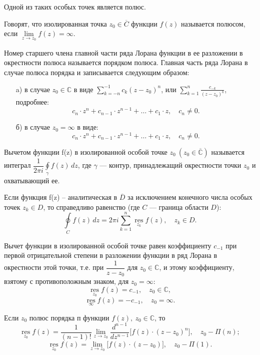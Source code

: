 Одной из таких особых точек является полюс.
\begin{definition}
Говорят, что изолированная точка $z_0\in \overline{C}$ функции $f(z)$ называется полюсом, если $\lim\limits_{z\to z_0}f(z)=\infty$.
\end{definition}
\begin{remark}
Номер старшего члена главной части ряда Лорана функции в ее разложении в окрестности полюса называется порядком полюса.
Главная часть ряда Лорана в случае полюса порядка и записывается следующим образом:
\begin{itemize}
\item[a)] в случае $z_0\in\mathbb{C}$ в виде $\sum_{k=-n}^{-1} c_k(z-z_0)^n$, или $\sum_{k=1}^{n} \frac{c_{-k}}{(z-z_0)^k}$, подробнее:
$$
c_n\cdot z^n+ c_{n-1}\cdot z^{n-1}+\ldots+c_1\cdot z,\quad c_n\ne0.
$$
\item[б)] в случае $z_0=\infty$ в виде:
$$
c_n\cdot z^n+ c_{n-1}\cdot z^{n-1}+\ldots+c_1\cdot z,\quad c_n\ne0.
$$
\end{itemize}
\end{remark}
\begin{definition}
Вычетом функции f(z) в изолированной особой точке $z_0~(z_0\in \overline{\mathbb{C}})$ называется интеграл $\dfrac{1}{2\pi i}\oint\limits_{\gamma} f(z)\,dz$, где $\gamma$ — контур, принадлежащий окрестности точки $z_0$ и охватывающий ее. 
\end{definition}
\begin{theorem}
Если функция f(z) -- аналитическая в $\overline{D}$ за исключением конечного числа особых точек $z_k\in D$, то справедливо равенство (где $C$ — граница области $D$):
\begin{equation}\label{ch1.rest}
\oint\limits_{C}f(z)\,dz= 2\pi i \sum_{k=1}^{n} \mathop{\operatorname{res}}\limits_{z_k} f(z),\quad z_k\in D.
\end{equation}
\end{theorem}
\begin{assertion}
Вычет функции в изолированной особой точке равен коэффициенту $c_{-1}$ при первой отрицательной степени в разложении функции в ряд Лорана в окрестности этой точки, т.е. при $\dfrac{1}{z-z_0}$ для $z_0\in \mathbb{C}$, и этому коэффициенту, взятому с противоположным знаком, для $z_0=\infty\colon$
$$
\mathop{\operatorname{res}}\limits_{z_0}f(z)=c_{-1},\quad z_0\in \mathbb{C},$$
$$
\mathop{\operatorname{res}}\limits_{\infty} f(z)=-c_{-1},\quad z_0=\infty.
$$
\end{assertion}
\begin{assertion}
Если $z_0$ полюс порядка п функции $f(z),~ z_0\in \mathbb{C}$, то
$$
\mathop{\operatorname{res}}\limits_{z_0}f(z)= \frac{1}{(n-1)!} \lim\limits_{z\to z_0} \frac{d^{n-1}}{dz^{n-1}} \bigl[f(z)\cdot (z-z_0)^n\bigr],\quad z_0-\Pi(n);
$$
$$
\mathop{\operatorname{res}}\limits_{z_0}f(z)= \lim\limits_{z\to z_0} \bigl[f(z)\cdot (z-z_0)\bigr],\quad z_0-\Pi(1).
$$ 
\end{assertion}
